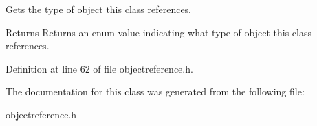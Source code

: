 Gets the type of object this class references. 

\begin{DoxyReturn}{Returns}
Returns an enum value indicating what type of object this class references. 
\end{DoxyReturn}


Definition at line 62 of file objectreference.h.



The documentation for this class was generated from the following file:\begin{DoxyCompactItemize}
\item 
objectreference.h\end{DoxyCompactItemize}
